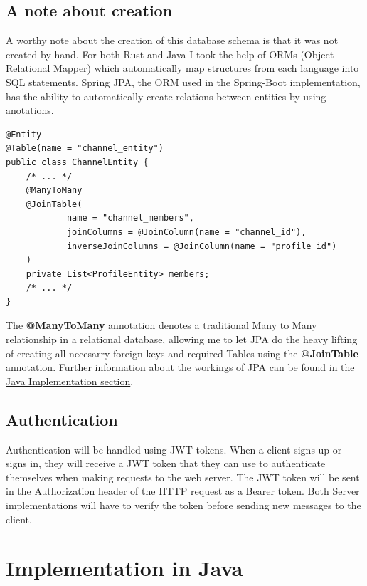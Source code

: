 \documentclass[a4paper,12pt]{article}
\begin{document}
	\subsection*{A note about creation}
	A worthy note about the creation of this database schema is that it was not created by hand. For both Rust and Java I took
	the help of ORMs (Object Relational Mapper) which automatically map structures from each language into SQL statements. Spring
	JPA, the ORM used in the Spring-Boot implementation, has the ability to automatically create relations between entities by using
	anotations.
	\begin{lstlisting}
@Entity
@Table(name = "channel_entity")
public class ChannelEntity {
	/* ... */
	@ManyToMany
	@JoinTable(
			name = "channel_members",
			joinColumns = @JoinColumn(name = "channel_id"),
			inverseJoinColumns = @JoinColumn(name = "profile_id")
	)
	private List<ProfileEntity> members;
	/* ... */
}
	\end{lstlisting}
	The \textbf{@ManyToMany} annotation denotes a traditional Many to Many relationship in a relational database, allowing me to
	let JPA do the heavy lifting of creating all necesarry foreign keys and required Tables using the \textbf{@JoinTable} annotation.
	Further information about the workings of JPA can be found in the \hyperref[sec:java_implementation]{Java Implementation section}.

	\subsection{Authentication}
	\label{subsec:authentication}
	Authentication will be handled using JWT tokens. When a client signs up or signs in, they will receive a JWT token that
	they can use to authenticate themselves when making requests to the web server. The JWT token will be sent in the 
	Authorization header of the HTTP request as a Bearer token. Both Server implementations will have to verify the token 
	before sending new messages to the client.

	\section{Implementation in Java}
	\label{sec:java_implementation}
\end{document}
